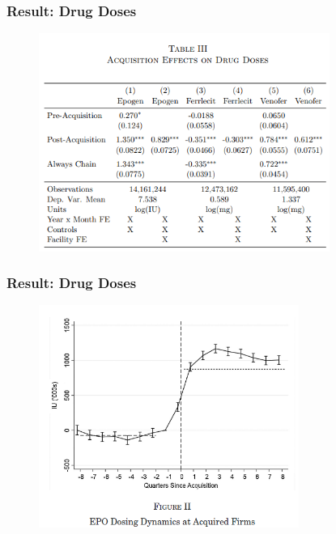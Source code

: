 \documentclass[aspectratio=169]{beamer}
\begin{document}
\begin{frame}\frametitle{Result: Drug Doses}
\setlength{\leftmargini}{12pt}
\vspace{-7.5mm}
 \begin{figure}[h!]
        \centering
        \includegraphics[width=95mm]{figure3_1.png}
        \label{fig:method}
        \end{figure}
        \vspace{-9.5mm}

\end{frame}

\begin{frame}\frametitle{Result: Drug Doses}
\setlength{\leftmargini}{12pt}
\vspace{-7.5mm}
 \begin{figure}[h!]
        \centering
        \includegraphics[width=85mm]{figure3_6.png}
        \label{fig:method}
        \end{figure}
        \vspace{-9.5mm}

\end{frame}
\end{document}
